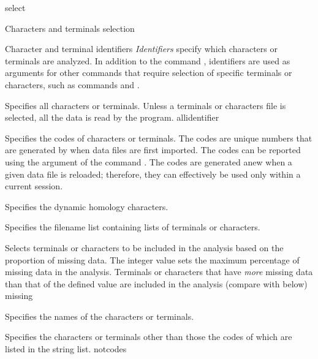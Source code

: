 \begin{command}{select}{}
\begin{arguments}
\begin{argumentgroup}{Characters and terminals selection}
\end{argumentgroup}

\begin{argumentgroup}{Character and terminal identifiers}\label{identifiers}
{\emph{Identifiers} specify which characters or terminals are analyzed.
In addition to the command , identifiers are used as
arguments for other commands that require selection of specific terminals or
characters, such as commands  and
.}

{Specifies all characters or terminals. Unless a terminals or characters file
is selected, all the data is read by the program.}
{allidentifier}

{Specifies the codes of characters or terminals. The codes are unique
numbers that are generated by \poy when data files are first imported.
The codes can be reported using the argument 
of the command . The codes are generated anew
when a given data file is reloaded; therefore, they can effectively be used
only within a current \poy session.}
{}

{Specifies the dynamic homology characters.}
{}

{Specifies the filename list containing lists of terminals or
characters.}
{}

{Selects terminals or characters to be included in the analysis
based on the proportion of missing data. The
integer value sets the maximum percentage of missing
data in the analysis. Terminals or characters that have \emph{more} missing data
than that of the defined value are included in the analysis (compare with  below)}
{missing}

{Specifies the names of the characters or terminals.}
{}

{Specifies the characters or terminals other than those the
codes of which are listed in the string list.}
{notcodes}


\end{argumentgroup}
\end{arguments}
\end{command}
